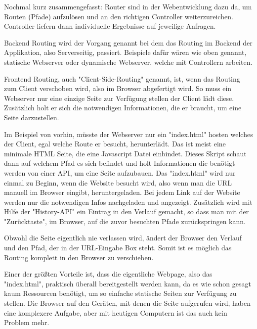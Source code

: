 Nochmal kurz zusammengefasst: Router sind in der Webentwicklung dazu da, um Routen (Pfade) aufzulösen und an den richtigen Controller weiterzureichen. Controller liefern dann individuelle Ergebnisse auf jeweilige Anfragen.


Backend Routing wird der Vorgang genannt bei dem das Routing im Backend der Applikation, also Serverseitig, passiert. Beispiele dafür wären wie oben genannt, statische Webserver oder dynamische Webserver, welche mit Controllern arbeiten.


Frontend Routing, auch "Client-Side-Routing" genannt, ist, wenn das Routing zum Client verschoben wird, also im Browser abgefertigt wird. So muss ein Webserver nur eine einzige Seite zur Verfügung stellen der Client lädt diese. Zusätzlich holt er sich die notwendigen Informationen, die er braucht, um eine Seite darzustellen.

Im Beispiel von vorhin, müsste der Webserver nur ein "{\ttfamily index.html}" hosten welches der Client, egal welche Route er besucht, herunterlädt. Das ist meist eine minimale HTML Seite, die eine Javascript Datei einbindet. Dieses Skript schaut dann auf welchem Pfad es sich befindet und holt Informationen die benötigt werden von einer API, um eine Seite aufzubauen. Das "{\ttfamily index.html}" wird nur einmal zu Beginn, wenn die Website besucht wird, also wenn man die URL manuell im Browser eingibt, heruntergeladen. Bei jedem Link auf der Website werden nur die notwendigen Infos nachgeladen und angezeigt. Zusätzlich wird mit Hilfe der "History-API" ein Eintrag in den Verlauf gemacht, so dass man mit der "Zurücktaste", im Browser, auf die zuvor besuchten Pfade zurückspringen kann.

Obwohl die Seite eigentlich nie verlassen wird, ändert der Browser den Verlauf und den Pfad, der in der URL-Eingabe Box steht. Somit ist es möglich das Routing komplett in den Browser zu verschieben.


Einer der größten Vorteile ist, dass die eigentliche Webpage, also das "{\ttfamily index.html}", praktisch überall bereitgestellt werden kann, da es wie schon gesagt kaum Ressourcen benötigt, um so einfache statische Seiten zur Verfügung zu stellen. Die Browser auf den Geräten, mit denen die Seite aufgerufen wird, haben eine komplexere Aufgabe, aber mit heutigen Computern ist das auch kein Problem mehr.

